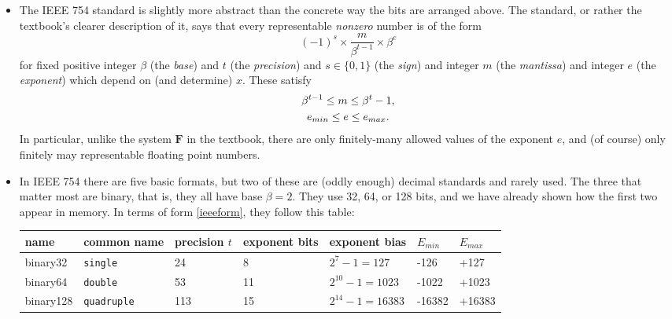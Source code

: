 \documentclass[11pt]{amsart}
\begin{document}
\begin{itemize}

\item The IEEE 754 standard is slightly more abstract than the concrete way the bits are arranged above.  The standard, or rather the textbook's clearer description of it, says that every representable \emph{nonzero} number is of the form
\begin{equation}
(-1)^s \times \frac{m}{\beta^{t-1}} \times \beta^e  \label{ieeeform}
\end{equation}
for fixed positive integer $\beta$ (the \emph{base}) and $t$ (the \emph{precision}) and $s\in\{0,1\}$ (the \emph{sign}) and integer $m$ (the \emph{mantissa}) and integer $e$ (the \emph{exponent}) which depend on (and determine) $x$.  These satisfy
\begin{gather}
\beta^{t-1} \le m \le \beta^t - 1, \label{ieeeconstraint} \\
e_{min} \le e \le e_{max}. \notag
\end{gather}
In particular, unlike the system $\mathbf{F}$ in the textbook, there are only finitely-many allowed values of the exponent $e$, and (of course) only finitely may representable floating point numbers.

\item In IEEE 754 there are five basic formats, but two of these are (oddly enough) decimal standards and rarely used.  The three that matter most are binary, that is, they all have base $\beta=2$.  They use 32, 64, or 128 bits, and we have already shown how the first two appear in memory.  In terms of form \eqref{ieeeform}, they follow this table:

\medskip
\small
\begin{tabular}{lllllll}
name     & common name & precision $t$ & exponent bits & exponent bias & $E_{min}$ & $E_{max}$ \\ \hline
binary32 &    \texttt{single} & 24 &  8 &     $2^7-1=127$ &  -126 &  +127 \\
binary64 &    \texttt{double} & 53 & 11 & $2^{10}-1=1023$ & -1022 & +1023 \\
binary128 &\texttt{quadruple} &113 & 15 &$2^{14}-1=16383$ &-16382 &+16383
\end{tabular}


\end{itemize}
\end{document}
